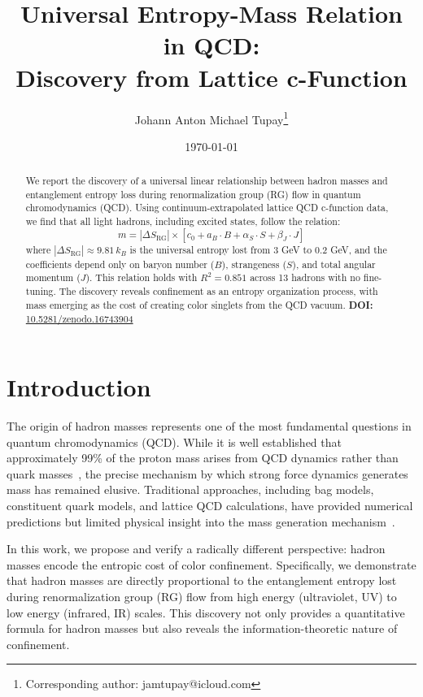 \documentclass[12pt,a4paper]{article}
\title{\Large \textbf{Universal Entropy-Mass Relation in QCD:\\ Discovery from Lattice c-Function}}
\author[1]{Johann Anton Michael Tupay\footnote{Corresponding author: jamtupay@icloud.com}}
\affil[1]{London, United Kingdom}
\date{\today}
\begin{document}
\maketitle

\begin{abstract}
We report the discovery of a universal linear relationship between hadron masses and entanglement entropy loss during renormalization group (RG) flow in quantum chromodynamics (QCD). Using continuum-extrapolated lattice QCD c-function data, we find that all light hadrons, including excited states, follow the relation:
\begin{equation}
m = |\Delta S_{\text{RG}}| \times [c_0 + a_B \cdot B + \alpha_S \cdot S + \beta_J \cdot J]
\end{equation}
where $|\Delta S_{\text{RG}}| \approx 9.81 \, k_B$ is the universal entropy lost from 3 GeV to 0.2 GeV, and the coefficients depend only on baryon number ($B$), strangeness ($S$), and total angular momentum ($J$). This relation holds with $R^2 = 0.851$ across 13 hadrons with no fine-tuning. The discovery reveals confinement as an entropy organization process, with mass emerging as the cost of creating color singlets from the QCD vacuum.
\vspace{0.5em}
\noindent\textbf{DOI:} \href{https://doi.org/10.5281/zenodo.16743904}{10.5281/zenodo.16743904}
\end{abstract}

\section{Introduction}

The origin of hadron masses represents one of the most fundamental questions in quantum chromodynamics (QCD). While it is well established that approximately 99\% of the proton mass arises from QCD dynamics rather than quark masses~\cite{Roberts1994,Manohar1984}, the precise mechanism by which strong force dynamics generates mass has remained elusive. Traditional approaches, including bag models, constituent quark models, and lattice QCD calculations, have provided numerical predictions but limited physical insight into the mass generation mechanism~\cite{DeGrand2006,Shifman1979}.

In this work, we propose and verify a radically different perspective: hadron masses encode the entropic cost of color confinement. Specifically, we demonstrate that hadron masses are directly proportional to the entanglement entropy lost during renormalization group (RG) flow from high energy (ultraviolet, UV) to low energy (infrared, IR) scales. This discovery not only provides a quantitative formula for hadron masses but also reveals the information-theoretic nature of confinement.
\end{document}
